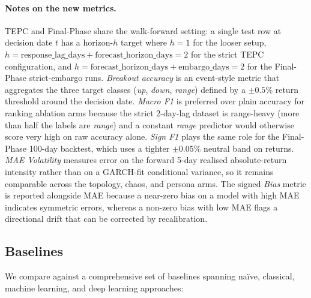\documentclass[11pt]{article}
\begin{document}
\paragraph{Notes on the new metrics.}
TEPC and Final-Phase share the walk-forward setting: a single test row at decision date $t$ has a horizon-$h$ target where $h{=}1$ for the looser setup, $h{=}\text{response\_lag\_days}{+}\text{forecast\_horizon\_days}{=}2$ for the strict TEPC configuration, and $h{=}\text{forecast\_horizon\_days}{+}\text{embargo\_days}{=}2$ for the Final-Phase strict-embargo runs. \emph{Breakout accuracy} is an event-style metric that aggregates the three target classes (\textit{up}, \textit{down}, \textit{range}) defined by a $\pm 0.5\%$ return threshold around the decision date. \emph{Macro F1} is preferred over plain accuracy for ranking ablation arms because the strict 2-day-lag dataset is range-heavy (more than half the labels are \textit{range}) and a constant \textit{range} predictor would otherwise score very high on raw accuracy alone. \emph{Sign F1} plays the same role for the Final-Phase 100-day backtest, which uses a tighter $\pm 0.05\%$ neutral band on returns. \emph{MAE Volatility} measures error on the forward 5-day realised absolute-return intensity rather than on a GARCH-fit conditional variance, so it remains comparable across the topology, chaos, and persona arms. The signed \emph{Bias} metric is reported alongside MAE because a near-zero bias on a model with high MAE indicates symmetric errors, whereas a non-zero bias with low MAE flags a directional drift that can be corrected by recalibration.

\subsection{Baselines}

We compare against a comprehensive set of baselines spanning na\"ive, classical, machine learning, and deep learning approaches:
\end{document}
